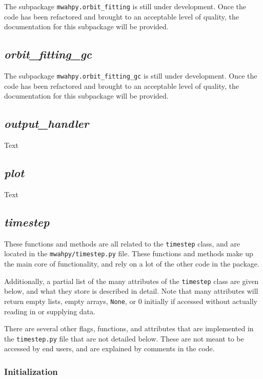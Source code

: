 \documentclass{article}
\begin{document}
The subpackage \verb!mwahpy.orbit_fitting! is still under development. Once the code has been refactored and brought to an acceptable level of quality, the documentation for this subpackage will be provided. 

\subsection{\textit{orbit\_fitting\_gc}}

The subpackage \verb!mwahpy.orbit_fitting_gc! is still under development. Once the code has been refactored and brought to an acceptable level of quality, the documentation for this subpackage will be provided.  

\subsection{\textit{output\_handler}}

Text

\subsection{\textit{plot}}

Text

\subsection{\textit{timestep}} \label{sec:doc_timestep}

These functions and methods are all related to the \verb!timestep! class, and are located in the \verb!mwahpy/timestep.py! file. These functions and methods make up the main core of \mwahpy functionality, and rely on a lot of the other code in the package.

Additionally, a partial list of the many attributes of the \verb!timestep! class are given below, and what they store is described in detail. Note that many attributes will return empty lists, empty arrays, \verb!None!, or 0 initially if accessed without actually reading in or supplying data. 

There are several other flags, functions, and attributes that are implemented in the \verb!timestep.py! file that are not detailed below. These are not meant to be accessed by end users, and are explained by comments in the code.

\subsubsection{Initialization}
\end{document}
